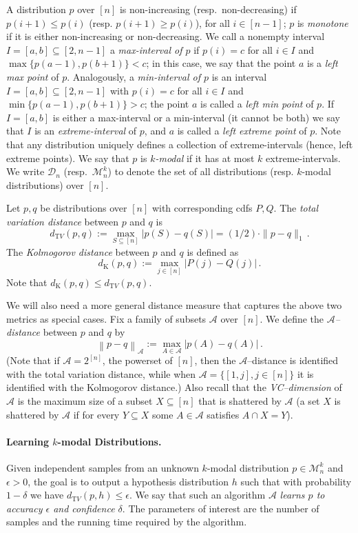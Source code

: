 \documentclass[10pt]{article}
\theoremstyle{definition}
\numberwithin{equation}{section}
\newcommand{\dtv}{d_{\mathrm TV}}
\newcommand{\dk}{d_{\mathrm K}}
\newcommand{\eps}{\epsilon}
\newcommand{\dis}{{\mathcal{D}}}
\newcommand{\mon}{{\mathcal{M}}}
\newcommand{\A}{{\mathcal{A}}}
\newcommand{\norm}[1]{\left\|#1\right\|}
\begin{document}
A distribution $p$ over $[n]$ is non-increasing (resp.\ non-decreasing)
if $p(i+1) \leq p(i)$ (resp. $p(i+1) \geq p(i)$), for all $i \in [n-1]$;
$p$ is \emph{monotone} if it is either non-increasing or non-decreasing.
We call a nonempty interval $I=[a,b] \subseteq [2, n-1]$ a \emph{max-interval of $p$} if
$p(i) = c$ for all $i \in I$ and $\max\{p(a-1), p(b+1)\} < c$; in this case,
we say that the point $a$ is a \emph{left max point} of $p$.
Analogously, a \emph{min-interval of $p$} is an interval
 $I=[a,b] \subseteq [2, n-1]$ with $p(i) = c$ for all $i \in I$ and $\min \{p(a-1), p(b+1)\} > c$;
 the point $a$ is called a \emph{left min point} of $p$.
If $I=[a,b]$ is either a max-interval or a min-interval (it cannot be both)
we say that $I$ is an \emph{extreme-interval} of $p$, and $a$ is called a \emph{left extreme point} of $p$.
Note that any distribution uniquely defines a collection of extreme-intervals (hence, left extreme points).
We say that $p$ is \emph{$k$-modal} if it has at most $k$ extreme-intervals.
{We write $\dis_n$ (resp.\ $\mon^k_n$) to denote the set of all distributions
(resp. $k$-modal distributions) over $[n]$.}


Let $p, q$ be distributions over $[n]$ with corresponding cdfs $P, Q$.
The \emph{total variation distance} between $p$ and $q$ is
\[
\dtv (p,q) := \max_{S \subseteq [n]} |p(S) - q(S)|  = (1/2)\cdot
\|p-q\|_1\,.
\]
The \emph{Kolmogorov distance} between $p$ and $q$ is defined as
\[
\dk(p,q):= \max_{j \in [n]} \left| P(j) - Q(j) \right|\,.
\]
Note that $\dk(p,q) \le \dtv (p,q)$.

{We will also need a more general distance measure that captures the above two metrics as special cases.
Fix a family of subsets $\mathcal{A}$ over $[n]$. 
We define the \emph{$\mathcal{A}$--distance} between $p$ and $q$ by 
\[
\norm {p-q}_{\mathcal{A}}
:= \max_{A\in \mathcal{A}} |p(A) - q(A)|\,.
\]
(Note that if $\mathcal{A} = 2^{[n]}$, the powerset of $[n]$, then  the 
$\mathcal{A}$--distance is identified with the total variation distance, while when $\mathcal{A} = \{ [1, j], j \in [n]\}$ 
it is identified with the Kolmogorov distance.)
Also recall that the \emph{VC--dimension} of $\mathcal A$ is the maximum size 
of a subset $X\subseteq [n]$ that is shattered by $\mathcal A$ (a set $X$ is shattered by
$\mathcal A$ if for every $Y \subseteq X$ some $A\in\mathcal A$ satisfies $A\cap X = Y$).
}


\paragraph{Learning $k$-modal Distributions.}  Given
independent samples from an unknown $k$-modal distribution
$p \in \mon^k_n$ and $\eps>0$, the goal is to output a hypothesis
distribution $h$ such that with probability $1-\delta$ we have
$\dtv(p,h) \leq \eps$.  We say that such an algorithm $\A$
\emph{learns $p$ to accuracy $\eps$ and confidence $\delta$}. The
parameters of interest are the number of samples and the running time
required by the algorithm.
\end{document}
